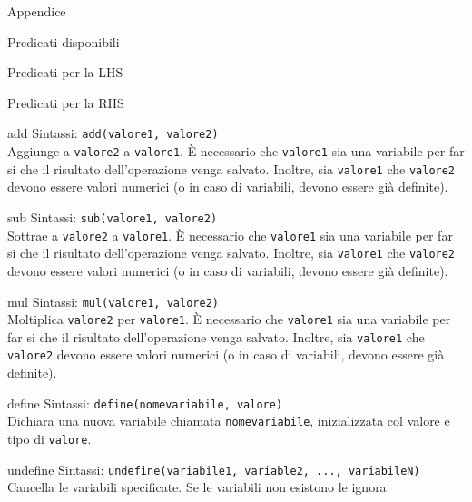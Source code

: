 \begin{chapter}{Appendice}
\begin{section}{Predicati disponibili}
\begin{subsection}{Predicati per la LHS}
	\end{subsection}

	\begin{subsection}{Predicati per la RHS}
	\label{sec:predicates-rhs}

		\begin{subsubsection}{add}
		\label{sec:predicates-rhs-add}
		Sintassi: \verb!add(valore1, valore2)!\\
		Aggiunge a \verb,valore2, a \verb,valore1,. \`E necessario che \verb,valore1, sia una
		variabile per far si che il risultato dell'operazione venga salvato. Inoltre, sia
		\verb,valore1, che \verb,valore2, devono essere valori numerici (o in caso di variabili,
		devono essere gi\`a definite).
		\end{subsubsection}

		\begin{subsubsection}{sub}
		\label{sec:predicates-rhs-sub}
		Sintassi: \verb!sub(valore1, valore2)!\\
		Sottrae a \verb,valore2, a \verb,valore1,. \`E necessario che \verb,valore1, sia una
		variabile per far si che il risultato dell'operazione venga salvato. Inoltre, sia
		\verb,valore1, che \verb,valore2, devono essere valori numerici (o in caso di variabili,
		devono essere gi\`a definite).
		\end{subsubsection}

		\begin{subsubsection}{mul}
		\label{sec:predicates-rhs-mul}
		Sintassi: \verb!mul(valore1, valore2)!\\
		Moltiplica \verb,valore2, per \verb,valore1,. \`E necessario che \verb,valore1, sia una
		variabile per far si che il risultato dell'operazione venga salvato. Inoltre, sia
		\verb,valore1, che \verb,valore2, devono essere valori numerici (o in caso di variabili,
		devono essere gi\`a definite).
		\end{subsubsection}

		\begin{subsubsection}{define}
		\label{sec:predicates-rhs-define}
		Sintassi: \verb!define(nomevariabile, valore)!\\
		Dichiara una nuova variabile chiamata \verb,nomevariabile,, inizializzata col valore e
		tipo di \verb,valore,.
		\end{subsubsection}

		\begin{subsubsection}{undefine}
		\label{sec:predicates-rhs-undefine}
		Sintassi: \verb!undefine(variabile1, variable2, ..., variabileN)!\\
		Cancella le variabili specificate. Se le variabili non esistono le ignora.
		\end{subsubsection}


\end{subsection}
\end{section}
\end{chapter}
